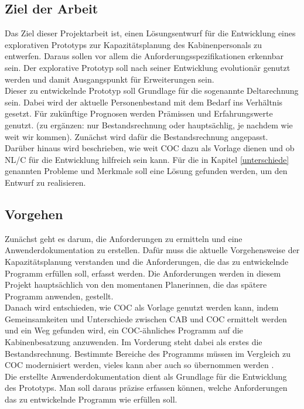 \documentclass [12pt, a4paper, oneside, titlepage, ngerman]{article}
\begin{document}
\subsection {Ziel der Arbeit} 
Das Ziel dieser Projektarbeit ist, einen Lösungsentwurf für die Entwicklung eines explorativen Prototyps zur Kapazitätsplanung des Kabinenpersonals zu entwerfen. Daraus sollen vor allem die Anforderungsspezifikationen erkennbar sein. Der explorative Prototyp soll nach seiner Entwicklung evolutionär genutzt werden und damit Ausgangspunkt für Erweiterungen sein. \\
Dieser zu entwickelnde Prototyp soll Grundlage für die sogenannte Deltarechnung sein. Dabei wird der aktuelle Personenbestand mit dem Bedarf ins Verhältnis gesetzt. Für zukünftige Prognosen werden Prämissen und Erfahrungswerte genutzt. (zu ergänzen: nur Bestandsrechnung oder hauptsächlig, je nachdem wie weit wir kommen). Zunächst wird dafür die Bestandsrechnung angepasst. Darüber hinaus wird beschrieben, wie weit \ac{COC} dazu als Vorlage dienen und ob \ac{NL/C} für die Entwicklung hilfreich sein kann. Für die in Kapitel \ref{unterschiede} genannten Probleme und Merkmale soll eine Lösung gefunden werden, um den Entwurf zu realisieren.

\subsection {Vorgehen}
Zunächst geht es darum, die Anforderungen zu ermitteln und eine Anwenderdokumentation zu erstellen. Dafür muss die aktuelle Vorgehensweise der Kapazitätsplanung verstanden und die Anforderungen, die das zu entwickelnde Programm erfüllen soll, erfasst werden. Die Anforderungen werden in diesem Projekt hauptsächlich von den momentanen Planerinnen, die das spätere Programm anwenden, gestellt. \\
Danach wird entschieden, wie \ac{COC} als Vorlage genutzt werden kann, indem Gemeinsamkeiten und Unterschiede zwischen \ac{CAB} und \ac{COC} ermittelt werden und ein Weg gefunden wird, ein \ac{COC}-ähnliches Programm auf die Kabinenbesatzung anzuwenden. Im Vorderung steht dabei als erstes die Bestandsrechnung. Bestimmte Bereiche des Programms müssen im Vergleich zu \ac{COC} modernisiert werden, vieles kann aber auch so übernommen werden \cite[vgl.][]{Gespraech1}. \\ %
Die erstellte Anwenderdokumentation dient als Grundlage für die Entwicklung des Prototyps. Man soll daraus präzise erfassen können, welche Anforderungen das zu entwickelnde Programm wie erfüllen soll.
\end{document}
